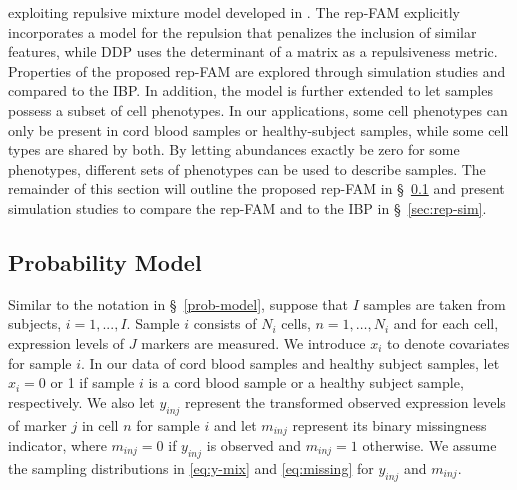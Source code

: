 \documentclass[12pt,]{article}
\begin{document}
exploiting repulsive mixture model developed in \cite{quinlan2017density}.  The
rep-FAM explicitly incorporates a model for the repulsion that penalizes the
inclusion of similar features, while DDP uses the determinant of a matrix as a
repulsiveness metric. Properties of the proposed rep-FAM are explored through
simulation studies and compared to the IBP. In addition, the model is further
extended to let samples possess a subset of cell phenotypes. In our
applications, some cell phenotypes can only be present in cord blood samples or
healthy-subject samples, while some cell types are shared by both.  By letting
abundances exactly be zero for some phenotypes, different sets of phenotypes
can be used to describe samples.  The remainder of this section will outline
the proposed rep-FAM in \S~\ref{sec:rep-model} and present simulation studies
to compare the rep-FAM and to the IBP in \S~\ref{sec:rep-sim}.




\subsection{Probability Model}\label{sec:rep-model}
Similar to the notation in \S~\ref{prob-model}, suppose that $I$ samples are
taken from subjects, \(i = 1,...,I\). Sample \(i\)
consists of \(N_i\) cells, \(n=1, \ldots, N_i\) and for each cell,
expression levels of \(J\) markers are measured.  We introduce $x_i$ to denote
covariates for sample $i$.  In our data of cord blood samples and healthy
subject samples, let $x_i=0$ or 1 if sample $i$ is a cord blood sample or a
healthy subject sample, respectively.  We also let $y_{inj}$ represent the
transformed observed expression levels of marker $j$ in cell $n$ for sample $i$
and let $m_{inj}$ represent its binary missingness indicator, where $m_{inj} =
0$ if $y_{inj}$ is observed and $m_{inj} = 1$ otherwise.  We assume the
sampling distributions in \eqref{eq:y-mix} and \eqref{eq:missing} for $y_{inj}$
and $m_{inj}$.
\end{document}
